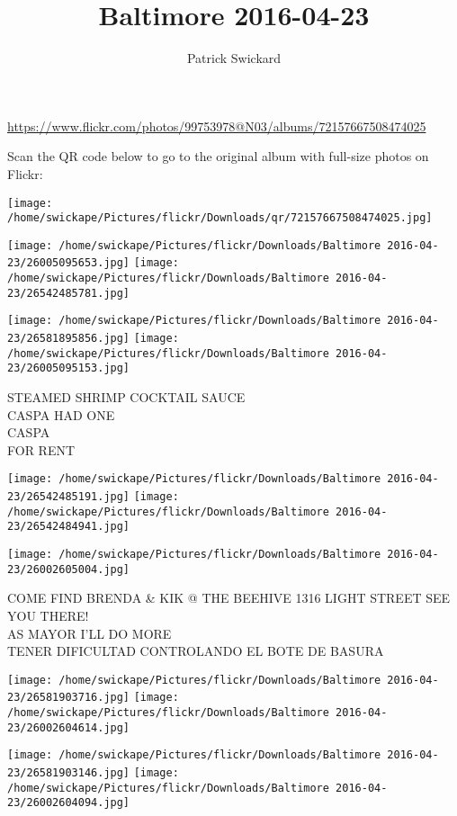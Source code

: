 \documentclass[10pt,letterpaper]{article}
\title{Baltimore 2016-04-23}
\author{Patrick Swickard}
\date{}
\begin{document}
\maketitle

\url{https://www.flickr.com/photos/99753978@N03/albums/72157667508474025}

Scan the QR code below to go to the original album with full-size photos on Flickr:

\texttt{[image: /home/swickape/Pictures/flickr/Downloads/qr/72157667508474025.jpg]}
\pagebreak

\texttt{[image: /home/swickape/Pictures/flickr/Downloads/Baltimore 2016-04-23/26005095653.jpg]}
\texttt{[image: /home/swickape/Pictures/flickr/Downloads/Baltimore 2016-04-23/26542485781.jpg]}

\texttt{[image: /home/swickape/Pictures/flickr/Downloads/Baltimore 2016-04-23/26581895856.jpg]}
\texttt{[image: /home/swickape/Pictures/flickr/Downloads/Baltimore 2016-04-23/26005095153.jpg]}

STEAMED SHRIMP COCKTAIL SAUCE\\
CASPA HAD ONE\\
CASPA\\
FOR RENT
\pagebreak

\texttt{[image: /home/swickape/Pictures/flickr/Downloads/Baltimore 2016-04-23/26542485191.jpg]}
\texttt{[image: /home/swickape/Pictures/flickr/Downloads/Baltimore 2016-04-23/26542484941.jpg]}

\vspace{0.25in}
\texttt{[image: /home/swickape/Pictures/flickr/Downloads/Baltimore 2016-04-23/26002605004.jpg]}

COME FIND BRENDA \& KIK @ THE BEEHIVE 1316 LIGHT STREET SEE YOU THERE!\\
AS MAYOR I'LL DO MORE\\
TENER DIFICULTAD CONTROLANDO EL BOTE DE BASURA
\pagebreak

\texttt{[image: /home/swickape/Pictures/flickr/Downloads/Baltimore 2016-04-23/26581903716.jpg]}
\texttt{[image: /home/swickape/Pictures/flickr/Downloads/Baltimore 2016-04-23/26002604614.jpg]}

\texttt{[image: /home/swickape/Pictures/flickr/Downloads/Baltimore 2016-04-23/26581903146.jpg]}
\texttt{[image: /home/swickape/Pictures/flickr/Downloads/Baltimore 2016-04-23/26002604094.jpg]}
\end{document}
